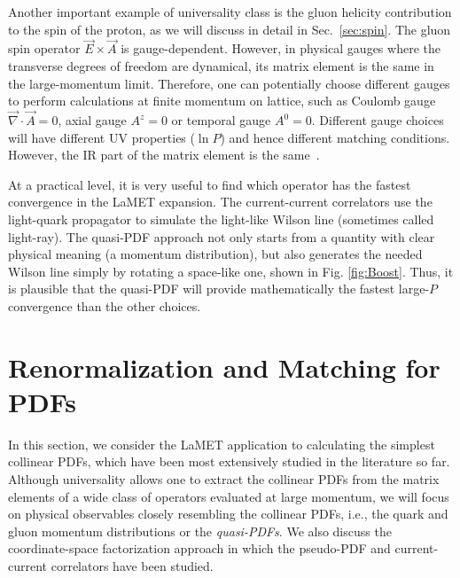\documentclass[aps,rmp,reprint,amsmath,amssymb,graphicx,longbibliography]{revtex4-1} %
\DeclareRobustCommand{\sec}[1]{Sec.~\ref{sec:#1}}
\begin{document}
Another important example of universality class is the gluon helicity
contribution to the spin of the proton, as we will
discuss in detail in \sec{spin}. The gluon
spin operator $\vec{E}\times \vec{A}$ is gauge-dependent. However, in physical gauges where the transverse degrees of
freedom are dynamical, its matrix element is the same in
the large-momentum limit. Therefore,
one can potentially choose different gauges to perform
calculations at finite momentum on lattice, such as Coulomb gauge $\vec{\nabla}\cdot \vec{A}=0$,
axial gauge $A^z=0$ or temporal gauge $A^0=0$.  Different gauge choices
will have different UV properties ($\ln P$) and hence different
matching conditions. However, the IR part of the matrix element
is the same~\cite{Hatta:2013gta}.

At a practical level, it is very useful to find which
operator has the fastest convergence in the LaMET expansion.
The current-current correlators use the light-quark propagator to simulate
the light-like Wilson line (sometimes called light-ray). The quasi-PDF approach not only starts from
a quantity with clear physical meaning (a momentum distribution),
but also generates the needed Wilson line simply by rotating a
space-like one, shown in Fig. \ref{fig:Boost}. Thus, it is plausible
that the quasi-PDF will provide mathematically the fastest large-$P$
convergence than the other choices.

\section{Renormalization and Matching for PDFs}
\label{sec:renorm}
In this section, we consider the LaMET application to calculating
the simplest collinear PDFs, which have been most extensively studied in the literature so far.
Although universality allows one to extract the collinear PDFs from the matrix elements of a wide class of operators evaluated at large momentum, we will focus on physical observables closely resembling the collinear PDFs, i.e.,
the quark and gluon momentum distributions or the {\it quasi-PDFs}. We also discuss
the coordinate-space factorization approach in which
the pseudo-PDF and current-current correlators have been studied.
\end{document}
